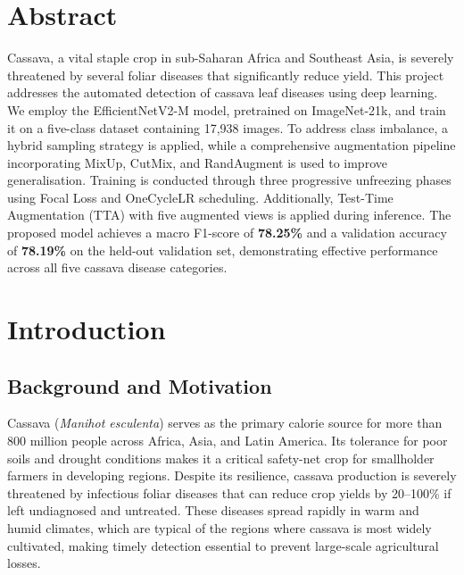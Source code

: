 \documentclass[12pt,a4paper]{article}
\begin{document}
\tableofcontents
\newpage

\section*{Abstract}

Cassava, a vital staple crop in sub-Saharan Africa and Southeast Asia, is severely threatened by several foliar diseases that significantly reduce yield. This project addresses the automated detection of cassava leaf diseases using deep learning. We employ the EfficientNetV2-M model, pretrained on ImageNet-21k, and train it on a five-class dataset containing 17,938 images. To address class imbalance, a hybrid sampling strategy is applied, while a comprehensive augmentation pipeline incorporating MixUp, CutMix, and RandAugment is used to improve generalisation. Training is conducted through three progressive unfreezing phases using Focal Loss and OneCycleLR scheduling. Additionally, Test-Time Augmentation (TTA) with five augmented views is applied during inference. The proposed model achieves a macro F1-score of \textbf{78.25\%} and a validation accuracy of \textbf{78.19\%} on the held-out validation set, demonstrating effective performance across all five cassava disease categories.

\section{Introduction}

\subsection{Background and Motivation}

Cassava (\textit{Manihot esculenta}) serves as the primary calorie source for more than 800 million people across Africa, Asia, and Latin America. Its tolerance for poor soils and drought conditions makes it a critical safety-net crop for smallholder farmers in developing regions. Despite its resilience, cassava production is severely threatened by infectious foliar diseases that can reduce crop yields by 20--100\% if left undiagnosed and untreated. These diseases spread rapidly in warm and humid climates, which are typical of the regions where cassava is most widely cultivated, making timely detection essential to prevent large-scale agricultural losses.
\end{document}
